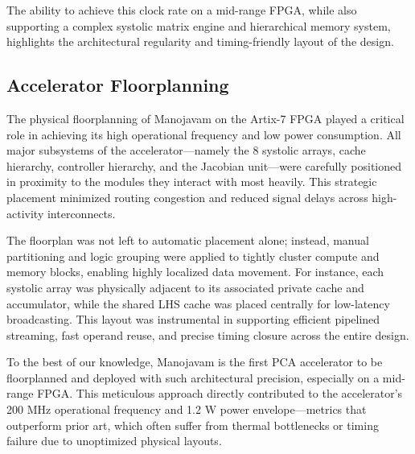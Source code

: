 The ability to achieve this clock rate on a mid-range FPGA, while also supporting a complex systolic matrix engine and hierarchical memory system, highlights the architectural regularity and timing-friendly layout of the design.

\subsection{Accelerator Floorplanning}
The physical floorplanning of Manojavam on the Artix-7 FPGA played a critical role in achieving its high operational frequency and low power consumption. All major subsystems of the accelerator—namely the 8 systolic arrays, cache hierarchy, controller hierarchy, and the Jacobian unit—were carefully positioned in proximity to the modules they interact with most heavily. This strategic placement minimized routing congestion and reduced signal delays across high-activity interconnects.

The floorplan was not left to automatic placement alone; instead, manual partitioning and logic grouping were applied to tightly cluster compute and memory blocks, enabling highly localized data movement. For instance, each systolic array was physically adjacent to its associated private cache and accumulator, while the shared LHS cache was placed centrally for low-latency broadcasting. This layout was instrumental in supporting efficient pipelined streaming, fast operand reuse, and precise timing closure across the entire design.

To the best of our knowledge, Manojavam is the first PCA accelerator to be floorplanned and deployed with such architectural precision, especially on a mid-range FPGA. This meticulous approach directly contributed to the accelerator’s 200 MHz operational frequency and 1.2 W power envelope—metrics that outperform prior art, which often suffer from thermal bottlenecks or timing failure due to unoptimized physical layouts.

